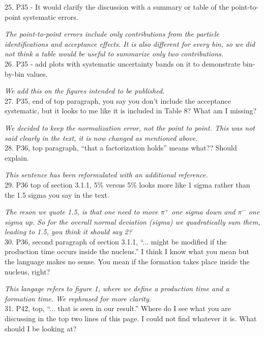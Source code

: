 \documentclass[12pt]{article}
\begin{document}
25.
P35 - It would clarify the discussion with a summary or table of the point-to-point systematic 
errors.

{\it The point-to-point errors include only contributions from the particle 
identifications and acceptance effects. It is also different for every bin, so
we did not think a table would be useful to summarize only two contributions.} \\

26.
P35 -
 add plots with systematic uncertainty bands on it to demonstrate bin-by-bin values.

{\it We add this on the figures intended to be published.} \\


27.
P35, end of top paragraph, you say you don’t include the acceptance systematic, but it looks 
to me like it is included in Table 8?  What am I missing?

{\it We decided to keep the normalization error, not the point to point. This was not
said clearly in the text, it is now changed as mentioned above.} \\


28.
P36, top paragraph, “that a factorization holds” means what??  Should explain.  

{\it This sentence has been reformulated with an additional reference.} \\


29.
P36 top of section 3.1.1, 5\% versus 5\% looks more like 1 sigma rather than the 1.5 sigma 
you say in the text.

{\it The reson we quote 1.5, is that one need to move $\pi^+$ one sigma down and $\pi^-$ one
sigma up. So for the overall normal deviation (sigma) we quadratically sum them,
leading to 1.5, you think it should say 2?} \\

30.
P36, second paragraph of section 3.1.1, “... might be modified if the production time occurs 
inside the nucleus.”  I think I know what you mean but the language makes no sense.  You 
mean if the formation takes place inside the nucleus, right?

{\it This langage refers to figure 1, where we define a production time and a 
formation time. We rephrased for more clarity.}\\

31.
P42, top, “... that is seen in our result.”  Where do I see what you are discussing in the top 
two lines of this page.  I could not find whatever it is.  What should I be looking at?
\end{document}
